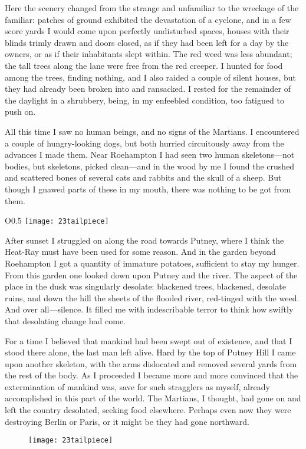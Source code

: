 Here the scenery changed from the strange and unfamiliar to the wreckage of the familiar: patches of ground exhibited the devastation of a cyclone, and in a few score yards I would come upon perfectly undisturbed spaces, houses with their blinds trimly drawn and doors closed, as if they had been left for a day by the owners, or as if their inhabitants slept within. The red weed was less abundant; the tall trees along the lane were free from the red creeper. I hunted for food among the trees, finding nothing, and I also raided a couple of silent houses, but they had already been broken into and ransacked. I rested for the remainder of the daylight in a shrubbery, being, in my enfeebled condition, too fatigued to push on.



All this time I saw no human beings, and no signs of the Martians. I encountered a couple of hungry-looking dogs, but both hurried circuitously away from the advances I made them. Near Roehampton I had seen two human skeletons—not bodies, but skeletons, picked clean—and in the wood by me I found the crushed and scattered bones of several cats and rabbits and the skull of a sheep. But though I gnawed parts of these in my mouth, there was nothing to be got from them.


\begin{a4}
	\begin{wrapfigure}{O}{0.5\textwidth}
		\centering
		\texttt{[image: 23tailpiece]}
	\end{wrapfigure}
\end{a4}

After sunset I struggled on along the road towards Putney, where I think the Heat-Ray must have been used for some reason. And in the garden beyond Roehampton I got a quantity of immature potatoes, sufficient to stay my hunger. From this garden one looked down upon Putney and the river. The aspect of the place in the dusk was singularly desolate: blackened trees, blackened, desolate ruins, and down the hill the sheets of the flooded river, red-tinged with the weed. And over all—silence. It filled me with indescribable terror to think how swiftly that desolating change had come.

For a time I believed that mankind had been swept out of existence, and that I stood there alone, the last man left alive. Hard by the top of Putney Hill I came upon another skeleton, with the arms dislocated and removed several yards from the rest of the body. As I proceeded I became more and more convinced that the extermination of mankind was, save for such stragglers as myself, already accomplished in this part of the world. The Martians, I thought, had gone on and left the country desolated, seeking food elsewhere. Perhaps even now they were destroying Berlin or Paris, or it might be they had gone northward.

\begin{letter}
	\begin{figure}[bh!]
		\centering
		\texttt{[image: 23tailpiece]}
	\end{figure}
	\enlargethispage{2\baselineskip}
\end{letter}

